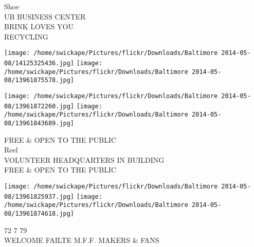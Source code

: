\documentclass[10pt,letterpaper]{article}
\begin{document}
Shoe\\
UB BUSINESS CENTER\\
BRINK LOVES YOU\\
RECYCLING
\pagebreak

\texttt{[image: /home/swickape/Pictures/flickr/Downloads/Baltimore 2014-05-08/14125325436.jpg]}
\texttt{[image: /home/swickape/Pictures/flickr/Downloads/Baltimore 2014-05-08/13961875578.jpg]}

\texttt{[image: /home/swickape/Pictures/flickr/Downloads/Baltimore 2014-05-08/13961872260.jpg]}
\texttt{[image: /home/swickape/Pictures/flickr/Downloads/Baltimore 2014-05-08/13961843689.jpg]}

FREE \& OPEN TO THE PUBLIC\\
Reel\\
VOLUNTEER HEADQUARTERS IN BUILDING\\
FREE \& OPEN TO THE PUBLIC
\pagebreak

\texttt{[image: /home/swickape/Pictures/flickr/Downloads/Baltimore 2014-05-08/13961825937.jpg]}
\texttt{[image: /home/swickape/Pictures/flickr/Downloads/Baltimore 2014-05-08/13961874618.jpg]}

72 7 79\\
WELCOME FAILTE M.F.F. MAKERS \& FANS
\pagebreak
\end{document}

